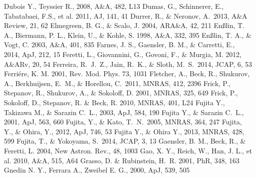 \begin{thebibliography}{99}
\begin{multicols}{2}
{	Dubois Y., Teyssier R., 2008, A\&A, 482, L13
	Dumas, G., Schinnerer, E., Tabatabaei, F.S., et al. 2011, AJ, 141, 41
	Durrer, R., \& Neronov, A.\ 2013, A\&A Review, 21, 62 
	Elmegreen, B. G., \& Scalo, J. 2004, ARA\&A, 42, 211
	En{\ss}lin, T. A., Biermann, P. L., Klein, U., \& Kohle, S. 1998, A\&A, 332, 395
	En{\ss}lin, T. A., \& Vogt, C. 2003, A\&A, 401, 835
	Farnes, J. S., Gaensler, B. M., \& Carretti, E., 2014, ApJ, 212, 15
	Feretti, L., Giovannini, G., Govoni, F., \& Murgia, M. 2012, A\&ARv, 20, 54
	Ferreira, R.~J.~Z., Jain, R.~K., \& Sloth, M.~S.\ 2014, JCAP, 6, 53 
	Ferri\'ere, K. M. 2001, Rev. Mod. Phys. 73, 1031
	Fletcher, A., Beck, R., Shukurov, A., Berkhuijsen, E.~M., \& Horellou, C.\ 2011, MNRAS, 412, 2396 
	Frick, P., Stepanov, R., Shukurov, A., \& Sokoloff, D. 2001, MNRAS, 325, 649
	Frick, P., Sokoloff, D., Stepanov, R. \& Beck, R. 2010, MNRAS, 401, L24
	Fujita Y., Takizawa M., \& Sarazin C.~L., 2003, ApJ, 584, 190 
	Fujita Y., \& Sarazin C.~L., 2001, ApJ, 563, 660 
	Fujita, Y., \& Kato, T.~N.\ 2005, MNRAS, 364, 247 
	Fujita, Y., \& Ohira, Y., 2012, ApJ, 746, 53
	Fujita Y., \& Ohira Y., 2013, MNRAS, 428, 599 
	Fujita, T., \& Yokoyama, S.\ 2014, JCAP, 3, 13
	Gaensler, B. M., Beck, R., \& Feretti, L. 2004, New Astron. Rev., 48, 1003
	Gao, X. Y., Reich, W., Han, J. L., et al. 2010, A\&A, 515, A64
	Grasso, D. \& Rubinstein, H.~R. 2001, PhR, 348, 163
	Gnedin N. Y., Ferrara A., Zweibel E. G., 2000, ApJ, 539, 505
}
\end{multicols}
\end{thebibliography}
